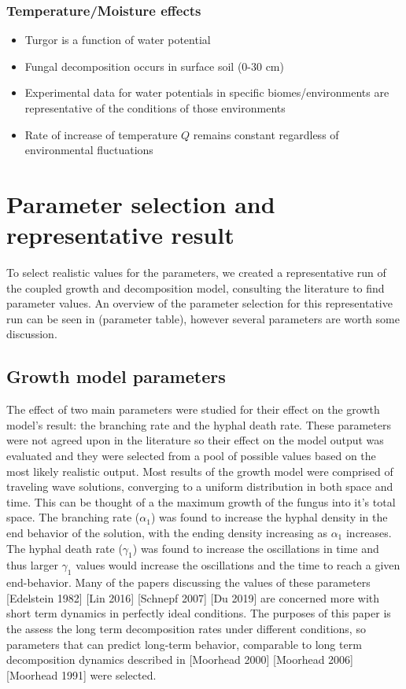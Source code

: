 \documentclass[12pt]{article}
\begin{document}
\begin{multicols}{2}
\subsubsection{Temperature/Moisture effects}
\begin{itemize}
	\item Turgor is a function of water potential
	\item Fungal decomposition occurs in surface soil (0-30 cm)
	\item Experimental data for water potentials in specific biomes/environments are representative of the conditions of those environments
	\item Rate of increase of temperature $Q$ remains constant regardless of environmental fluctuations
\end{itemize}

\section{Parameter selection and representative result}
To select realistic values for the parameters, we created a representative run of the coupled growth and decomposition model, consulting the literature to find parameter values. An overview of the parameter selection for this representative run can be seen in (parameter table), however several parameters are worth some discussion.
 
\subsection{Growth model parameters}
The effect of two main parameters were studied for their effect on the growth model's result: the branching rate and the hyphal death rate. These parameters were not agreed upon in the literature so their effect on the model output was evaluated and they were selected from a pool of possible values based on the most likely realistic output. Most results of the growth model were comprised of traveling wave solutions, converging to a uniform distribution in both space and time. This can be thought of a the maximum growth of the fungus into it's total space. The branching rate ($\alpha_{1}$) was found to increase the hyphal density in the end behavior of the solution, with the ending density increasing as $\alpha_{1}$ increases. The hyphal death rate ($\gamma_{1}$) was found to increase the oscillations in time and thus larger $\gamma_{1}$ values would increase the oscillations and the time to reach a given end-behavior. Many of the papers discussing the values of these parameters [Edelstein 1982] [Lin 2016] [Schnepf 2007] [Du 2019] are concerned more with short term dynamics in perfectly ideal conditions. The purposes of this paper is the assess the long term decomposition rates under different conditions, so parameters that can predict long-term behavior, comparable to long term decomposition dynamics described in [Moorhead 2000] [Moorhead 2006] [Moorhead 1991] were selected.


\end{multicols}
\end{document}
